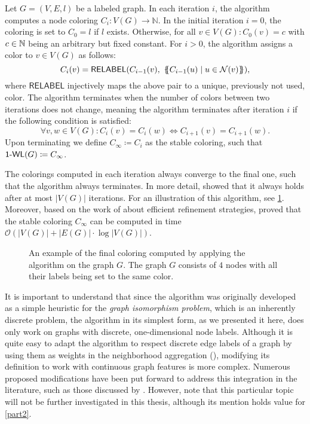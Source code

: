 \begin{definition}[$\wl$ Algorithm]
    Let $G = (V, E, l)$ be a labeled graph. In each iteration $i$, the \wl algorithm computes a node coloring $C_i: V(G) \rightarrow \mathbb{N}$. In the initial iteration $i=0$, the coloring is set to $C_0 = l$ if $l$ exists. Otherwise, for all $v \in V(G): C_0(v) = c$ with $c \in \mathbb{N}$ being an arbitrary but fixed constant. For $i > 0$, the algorithm assigns a color to $v \in V(G)$ as follows:
    \begin{equation*}
        C_i (v) = \textsf{RELABEL}(C_{i-1}(v),  \ \{\!\!\{ C_{i-1}(u) \mid u \in \mathcal{N}(v) \}\!\!\}),
    \end{equation*}
    where $\textsf{RELABEL}$ injectively maps the above pair to a unique, previously not used, color. The algorithm terminates when the number of colors between two iterations does not change, meaning the algorithm terminates after iteration $i$ if the following condition is satisfied:
    \begin{equation*}
        \forall v,w \in V(G):  C_i(v) = C_i(w) \iff C_{i+1}(v) = C_{i+1}(w).
    \end{equation*}
    Upon terminating we define $C_{\infty} \coloneqq C_i$ as the stable coloring, such that $\textsf{1-WL}(G) \coloneqq C_\infty$.
\end{definition}

The colorings computed in each iteration always converge to the final one, such that the algorithm always terminates. In more detail, \cite{Gro2017} showed that it always holds after at most $|V(G)|$ iterations. For an illustration of this algorithm, see \cref{fig:1wl_example}. Moreover, based on the work of \cite{Pai+87} about efficient refinement strategies, \cite{Car+82} proved that the stable coloring $C_\infty$ can be computed in time $\mathcal{O}(| V(G) | + |E(G)| \cdot \log | V(G) |)$.

\begin{figure}[H]
    \centering
    
    \caption{An example of the final coloring computed by applying the \wl algorithm on the graph $G$. The graph $G$ consists of $4$ nodes with all their labels being set to the same color.}
    \label{fig:1wl_example}
\end{figure}

It is important to understand that since the algorithm was originally developed as a simple heuristic for the \textit{graph isomorphism problem}, which is an inherently discrete problem, the \wl algorithm in its simplest form, as we presented it here, does only work on graphs with discrete, one-dimensional node labels. Although it is quite easy to adapt the algorithm to respect discrete edge labels of a graph by using them as weights in the neighborhood aggregation (\cite{Shervashidze2011}), modifying its definition to work with continuous graph features is more complex. Numerous proposed modifications have been put forward to address this integration in the literature, such as those discussed by \cite{Mor+2016}. However, note that this particular topic will not be further investigated in this thesis, although its mention holds value for \cref{part2}.


